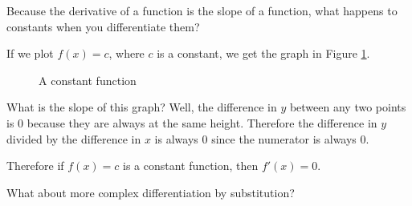 Because the derivative of a function is the slope of a function, what happens to constants when you differentiate them?

If we plot $f(x) = c$, where $c$ is a constant, we get the graph in Figure \ref{fig:constant-function}.

\begin{figure}[H]
    \centering
    \caption{A constant function}
    \label{fig:constant-function}
\end{figure}

What is the slope of this graph? Well, the difference in $y$ between any two points is $0$ because they are always at the same height.
Therefore the difference in $y$ divided by the difference in $x$ is always $0$ since the numerator is always $0$.

Therefore if $f(x) = c$ is a constant function, then $f'(x) = 0$.

What about more complex differentiation by substitution?

